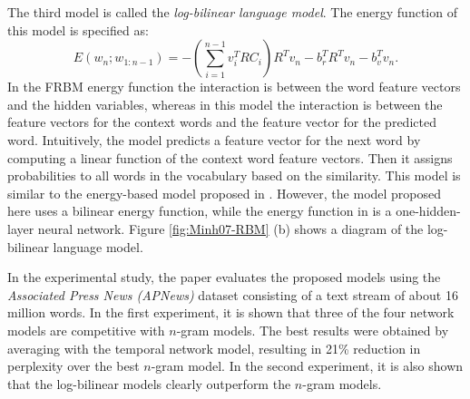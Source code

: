 The third model is called the \emph{log-bilinear language model}. The energy function of this model is specified as:
$$E(w_n; w_{1:n-1}) = -(\sum_{i=1}^{n-1} v_i^T R C_i)R^T v_n - b_r^T R^T v_n - b^T_v v_n.$$
In the FRBM energy function the interaction is between the word feature vectors and the hidden variables, whereas in this model the interaction is between the feature vectors for the context words and the feature vector for the predicted word. Intuitively, the model predicts a feature vector for the next word by computing a linear function of the context word feature vectors. Then it assigns probabilities to all words in the vocabulary based on the similarity. This model is similar to the energy-based model proposed in \cite{Bengio2003A}. However, the model proposed here uses a bilinear energy function, while the energy function in \cite{Bengio2003A} is a one-hidden-layer neural network. Figure \ref{fig:Minh07-RBM} (b) shows a diagram of the log-bilinear language model.

In the experimental study, the paper evaluates the proposed models using the \emph{Associated Press News (APNews)} dataset consisting of a text stream of about 16 million words. In the first experiment, it is shown that three of the four network models are competitive with $n$-gram models. The best results were obtained by averaging with the temporal network model, resulting in 21\% reduction in perplexity over the best $n$-gram model. In the second experiment, it is also shown that the log-bilinear models clearly outperform the $n$-gram models.
